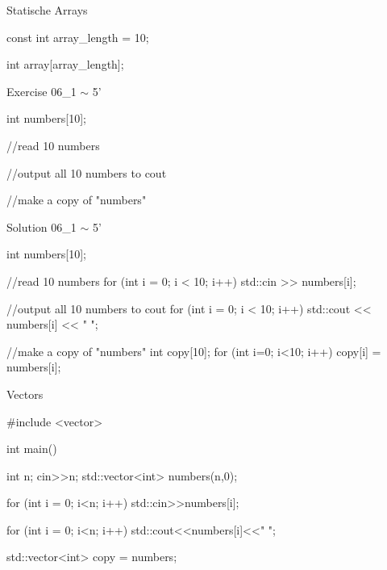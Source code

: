 \ifnum\conditionmacro=1 \documentclass[handout,usenames,dvipsnames]{beamer}\fi
\begin{document}
\begin{frame}[fragile]{Statische Arrays}
\begin{TFCpp}
const int array_length = 10;

int array[array_length];
\end{TFCpp}
\end{frame}

\begin{frame}[fragile]{Exercise 06\_1 $\sim$ 5'}
\begin{TPCpp}
int numbers[10];

//read 10 numbers

//output all 10 numbers to cout

//make a copy of "numbers"
\end{TPCpp}
\end{frame}

\begin{frame}[fragile]{Solution 06\_1 $\sim$ 5'}
\begin{TPCpp}
int numbers[10];

//read 10 numbers
for (int i = 0; i < 10; i++)
std::cin >> numbers[i];

//output all 10 numbers to cout
for (int i = 0; i < 10; i++)
std::cout << numbers[i] << " ";

//make a copy of "numbers"
int copy[10];
for (int i=0; i<10; i++)
	copy[i] = numbers[i];
\end{TPCpp}
\end{frame}

\begin{frame}[fragile]{Vectors}
\begin{TFCpp}
#include <vector>

int main(){
	int n; 
	cin>>n;
	std::vector<int> numbers(n,0);

	for (int i = 0; i<n; i++)
		std::cin>>numbers[i];
	
	for (int i = 0; i<n; i++)
		std::cout<<numbers[i]<<" ";
		
	std::vector<int> copy = numbers;

}
\end{TFCpp}
\end{frame}

\end{document}
